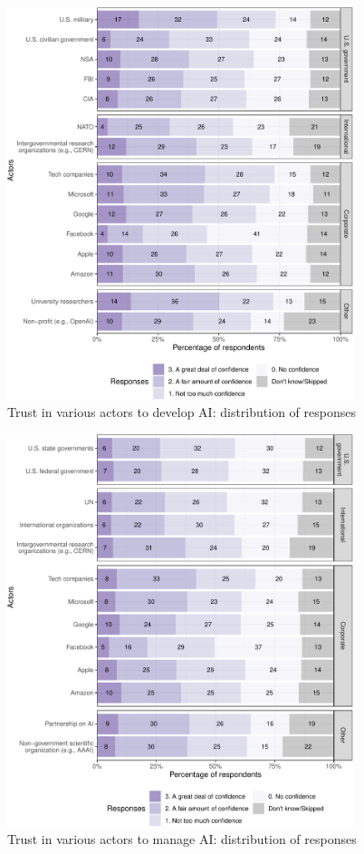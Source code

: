 \documentclass{article}
\begin{document}
\begin{figure}[h]
\centering
\includegraphics[width=0.9\textwidth]{images/trustdevtable1-1.pdf}
\caption{Trust in various actors to develop AI: distribution of responses}
\label{fig:trustdev}
\end{figure}

\begin{figure}[h]
\centering
\includegraphics[width=0.9\textwidth]{images/trustdevtable2-1.pdf}
\caption{Trust in various actors to manage AI: distribution of responses}
\label{fig:trustmanage}
\end{figure}
\end{document}
